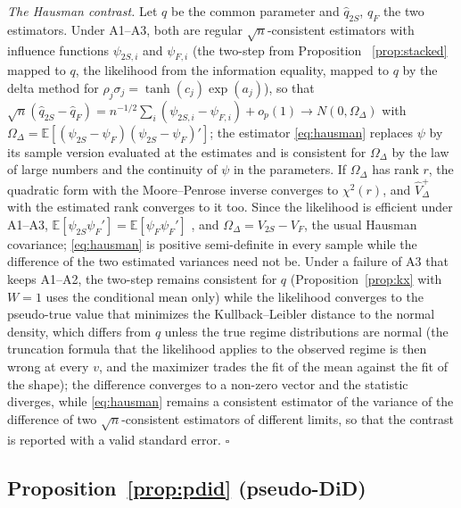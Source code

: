 \documentclass[11pt,a4paper]{article}
\theoremstyle{plain}
\theoremstyle{definition}
\theoremstyle{remark}
\newcommand{\E}{\mathbb{E}}
\newcommand{\1}{\mathbf{1}}
\begin{document}
\emph{The Hausman contrast.} Let $q$ be the common parameter and
$\hat q_{2S}$, $\hat q_F$ the two estimators. Under A1--A3, both are
regular $\sqrt n$-consistent estimators with influence functions
$\psi_{2S,i}$ and $\psi_{F,i}$ (the two-step from Proposition~%
\ref{prop:stacked} mapped to $q$, the likelihood from the information
equality, mapped to $q$ by the delta method for
$\rho_j\sigma_j=\tanh(c_j)\exp(a_j)$), so that
$\sqrt n(\hat q_{2S}-\hat q_F)=n^{-1/2}\sum_i(\psi_{2S,i}-\psi_{F,i})+o_p(1)\to N(0,\Omega_\Delta)$
with $\Omega_\Delta=\E[(\psi_{2S}-\psi_F)(\psi_{2S}-\psi_F)']$; the
estimator \eqref{eq:hausman} replaces $\psi$ by its sample version
evaluated at the estimates and is consistent for $\Omega_\Delta$ by the
law of large numbers and the continuity of $\psi$ in the parameters. If
$\Omega_\Delta$ has rank $r$, the quadratic form with the
Moore--Penrose inverse converges to $\chi^2(r)$, and $\hat V_\Delta^+$
with the estimated rank converges to it too. Since the likelihood is
efficient under A1--A3, $\E[\psi_{2S}\psi_F']=\E[\psi_F\psi_F']$
\citep[the lemma of][]{hausman1978}, and $\Omega_\Delta=V_{2S}-V_F$, the
usual Hausman covariance; \eqref{eq:hausman} is positive semi-definite
in every sample while the difference of the two estimated variances need
not be. Under a failure of A3 that keeps A1--A2, the two-step remains
consistent for $q$ (Proposition~\ref{prop:kx} with $W=1$ uses the
conditional mean only) while the likelihood converges to the
pseudo-true value that minimizes the Kullback--Leibler distance to the
normal density, which differs from $q$ unless the true regime
distributions are normal (the truncation formula that the likelihood
applies to the observed regime is then wrong at every $v$, and the
maximizer trades the fit of the mean against the fit of the shape); the
difference converges to a non-zero vector and the statistic diverges,
while \eqref{eq:hausman} remains a consistent estimator of the
variance of the difference of two $\sqrt n$-consistent estimators of
different limits, so that the contrast is reported with a valid
standard error. \hfill$\square$

\subsection{Proposition~\ref{prop:pdid} (pseudo-DiD)}
\end{document}
